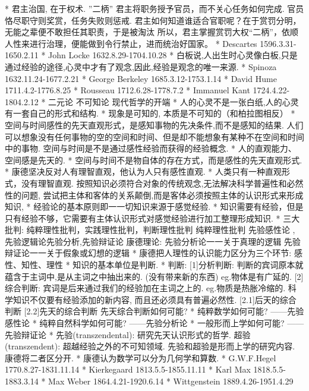 		* 君主治国, 在于权术.    ”二柄”
			君主将职务授予官员，而不关心任务如何完成. 官员恪尽职守则奖赏，任务失败则惩戒.
			君主如何知道谁适合官职呢？在于赏罚分明，无能之辈便不敢担任其职责，于是被淘汰
			所以，君主掌握赏罚大权“二柄”，依顺人性来进行治理，便能做到令行禁止，进而统治好国家。 
	* Descartes	1596.3.31-1650.2.11
	* John Locke	1632.8.29-1704.10.28
		* 白板说,人出生时心灵像白板,只是通过经验的途径,心灵中才有了观念,因此,经验是观念的唯一来源.
	* Spinoza 	1632.11.24-1677.2.21
	* George Berkeley	1685.3.12-1753.1.14
	* David Hume	1711.4.2-1776.8.25
	* Rousseau	1712.6.28-1778.7.2
	* Immanuel Kant	1724.4.22-1804.2.12
		* 二元论 不可知论 现代哲学的开端 
		* 人的心灵不是一张白纸,人的心灵有一套自己的形式和结构.
		* 现象是可知的, 本质是不可知的（和柏拉图相反）
		* 空间与时间感性的先天直观形式，是感知事物的先决条件,而不是感知的结果.
			人们可以想象没有任何事物的空的空间和时间、但是却不能想象有某种不在空间和时间中的事物.
			空间与时间是不是通过感性经验而获得的经验概念.
		* 人的直观能力、空间感是先天的.
		* 空间与时间不是物自体的存在方式，而是感性的先天直观形式.
		* 康德坚决反对人有理智直观，他认为人只有感性直观.
		* 人类只有一种直观形式，没有理智直观.
		按照知识必须符合对象的传统观念,无法解决科学普遍性和必然性的问题,
		尝试把主体和客体的关系颠倒,而是客体必须按照主体的认识形式来形成知识,
		* 经验论的基本原则即一一切知识来源于感觉经验.
		* 知识需要有经验，但是只有经验不够，它需要有主体认识形式对感觉经验进行加工整理形成知识.
		* 三大批判: 纯粹理性批判，实践理性批判，判断理性批判
			纯粹理性批判{ 先验感性论 , 先验逻辑论{先验分析,先验辩证论} }
			康德理论: 先验分析论一一关于真理的逻辑    先验辩证论一一关于假象或幻想的逻辑
		* 康德把人理性的认识能力区分为三个环节: 感性、知性、理性
		* 知识的基本单位是判断.
		* 判断: 
			[1]分析判断: 判断的宾词原本就蕴含于主词中,是从主词之中抽出来的. (没有带来新的东西) eg.物体是有广延的.
			[2]综合判断: 宾词是后来通过我们的经验加在主词之上的. eg.物质是热胀冷缩的.
				科学知识不仅要有经验添加的新内容, 而且还必须具有普遍必然性.
			[2.1]后天的综合判断
			[2.2]先天的综合判断
				先天综合判断如何可能?
				* 纯粹数学如何可能?	——先验感性论
				* 纯粹自然科学如何可能?	——先验分析论
				* 一般形而上学如何可能?	——先验辩证论
		* 先验(transzendental): 研究先天认识形式的哲学.
		超验(transzendent): 超越经验之外的不可知领域.
			先验和超验是形而上学的研究内容. 康德将二者区分开.
		* 康德认为数学可以分为几何学和算数.
	* G.W.F.Hegel	1770.8.27-1831.11.14
	* Kierkegaard	1813.5.5-1855.11.11
	* Karl Max	1818.5.5-1883.3.14
	* Max Weber	1864.4.21-1920.6.14
	* Wittgenstein	1889.4.26-1951.4.29
